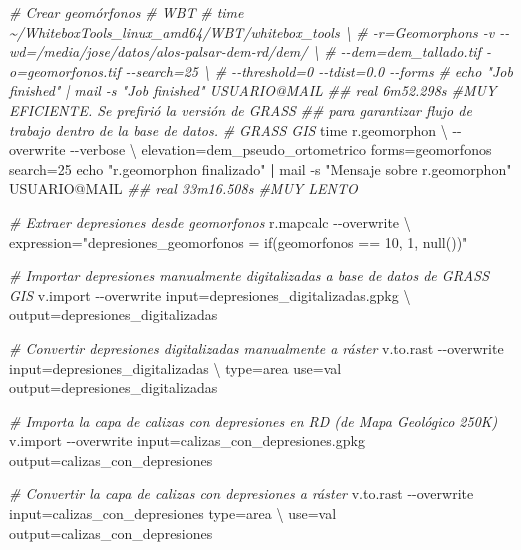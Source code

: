 \documentclass[spanish]{article}
\newenvironment{Shaded}{\begin{snugshade}}{\end{snugshade}}
\newcommand{\AttributeTok}[1]{\textcolor[rgb]{0.77,0.63,0.00}{#1}}
\newcommand{\BuiltInTok}[1]{#1}
\newcommand{\CommentTok}[1]{\textcolor[rgb]{0.56,0.35,0.01}{\textit{#1}}}
\newcommand{\DataTypeTok}[1]{\textcolor[rgb]{0.13,0.29,0.53}{#1}}
\newcommand{\ExtensionTok}[1]{#1}
\newcommand{\KeywordTok}[1]{\textcolor[rgb]{0.13,0.29,0.53}{\textbf{#1}}}
\newcommand{\NormalTok}[1]{#1}
\newcommand{\StringTok}[1]{\textcolor[rgb]{0.31,0.60,0.02}{#1}}
\begin{document}
\begin{Shaded}
\begin{Highlighting}[]
\CommentTok{\# Crear geomórfonos}
\CommentTok{\# WBT}
\CommentTok{\# time \textasciitilde{}/WhiteboxTools\_linux\_amd64/WBT/whitebox\_tools \textbackslash{}}
\CommentTok{\#   {-}r=Geomorphons {-}v {-}{-}wd=\textquotesingle{}/media/jose/datos/alos{-}palsar{-}dem{-}rd/dem/\textquotesingle{} \textbackslash{}}
\CommentTok{\#   {-}{-}dem=dem\_tallado.tif {-}o=geomorfonos.tif {-}{-}search=25 \textbackslash{}}
\CommentTok{\#   {-}{-}threshold=0 {-}{-}tdist=0.0 {-}{-}forms}
\CommentTok{\# echo "Job finished" | mail {-}s "Job finished" USUARIO@MAIL}
\CommentTok{\#\# real 6m52.298s \#MUY EFICIENTE. Se prefirió la versión de GRASS }
\CommentTok{\#\# para garantizar flujo de trabajo dentro de la base de datos.}
\CommentTok{\# GRASS GIS}
\BuiltInTok{time}\NormalTok{ r.geomorphon }\DataTypeTok{\textbackslash{}}
  \AttributeTok{{-}{-}overwrite} \AttributeTok{{-}{-}verbose} \DataTypeTok{\textbackslash{}}
\NormalTok{  elevation=dem\_pseudo\_ortometrico forms=geomorfonos search=25}
\BuiltInTok{echo} \StringTok{"r.geomorphon finalizado"} \KeywordTok{|} \ExtensionTok{mail} \AttributeTok{{-}s} \StringTok{"Mensaje sobre r.geomorphon"}\NormalTok{ USUARIO@MAIL}
\CommentTok{\#\# real 33m16.508s \#MUY LENTO}

\CommentTok{\# Extraer depresiones desde geomorfonos}
\ExtensionTok{r.mapcalc} \AttributeTok{{-}{-}overwrite} \DataTypeTok{\textbackslash{}}
\NormalTok{  expression=}\StringTok{"\textquotesingle{}depresiones\_geomorfonos\textquotesingle{} = if(geomorfonos == 10, 1, null())"}

\CommentTok{\# Importar depresiones manualmente digitalizadas a base de datos de GRASS GIS}
\ExtensionTok{v.import} \AttributeTok{{-}{-}overwrite}\NormalTok{ input=depresiones\_digitalizadas.gpkg }\DataTypeTok{\textbackslash{}}
\NormalTok{  output=depresiones\_digitalizadas}

\CommentTok{\# Convertir depresiones digitalizadas manualmente a ráster}
\ExtensionTok{v.to.rast} \AttributeTok{{-}{-}overwrite}\NormalTok{ input=depresiones\_digitalizadas }\DataTypeTok{\textbackslash{}}
\NormalTok{  type=area use=val output=depresiones\_digitalizadas}

\CommentTok{\# Importa la capa de calizas con depresiones en RD (de Mapa Geológico 250K)}
\ExtensionTok{v.import} \AttributeTok{{-}{-}overwrite}\NormalTok{ input=calizas\_con\_depresiones.gpkg output=calizas\_con\_depresiones}

\CommentTok{\# Convertir la capa de calizas con depresiones a ráster}
\ExtensionTok{v.to.rast} \AttributeTok{{-}{-}overwrite}\NormalTok{ input=calizas\_con\_depresiones type=area }\DataTypeTok{\textbackslash{}}
\NormalTok{  use=val output=calizas\_con\_depresiones}


\end{Highlighting}
\end{Shaded}
\end{document}
